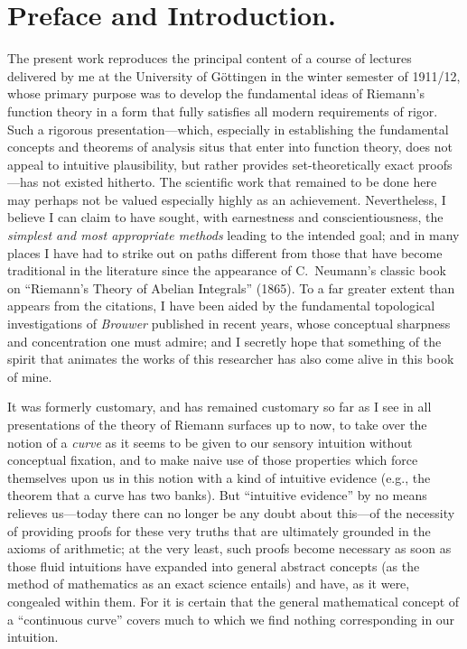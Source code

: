 \documentclass{article}
\begin{document}

\section*{Preface and Introduction.}

The present work reproduces the principal content of a course of lectures delivered by me at the University of Göttingen in the winter semester of 1911/12, whose primary purpose was to develop the fundamental ideas of Riemann's function theory in a form that fully satisfies all modern requirements of rigor. Such a rigorous presentation---which, especially in establishing the fundamental concepts and theorems of analysis situs that enter into function theory, does not appeal to intuitive plausibility, but rather provides set-theoretically exact proofs---has not existed hitherto. The scientific work that remained to be done here may perhaps not be valued especially highly as an achievement. Nevertheless, I believe I can claim to have sought, with earnestness and conscientiousness, the \emph{simplest and most appropriate methods} leading to the intended goal; and in many places I have had to strike out on paths different from those that have become traditional in the literature since the appearance of C.~Neumann's classic book on ``Riemann's Theory of Abelian Integrals'' (1865). To a far greater extent than appears from the citations, I have been aided by the fundamental topological investigations of \emph{Brouwer} published in recent years, whose conceptual sharpness and concentration one must admire; and I secretly hope that something of the spirit that animates the works of this researcher has also come alive in this book of mine.

It was formerly customary, and has remained customary so far as I see in all presentations of the theory of Riemann surfaces up to now, to take over the notion of a \emph{curve} as it seems to be given to our sensory intuition without conceptual fixation, and to make naive use of those properties which force themselves upon us in this notion with a kind of intuitive evidence (e.g., the theorem that a curve has two banks). But ``intuitive evidence'' by no means relieves us---today there can no longer be any doubt about this---of the necessity of providing proofs for these very truths that are ultimately grounded in the axioms of arithmetic; at the very least, such proofs become necessary as soon as those fluid intuitions have expanded into general abstract concepts (as the method of mathematics as an exact science entails) and have, as it were, congealed within them. For it is certain that the general mathematical concept of a ``continuous curve'' covers much to which we find nothing corresponding in our intuition.
\end{document}
